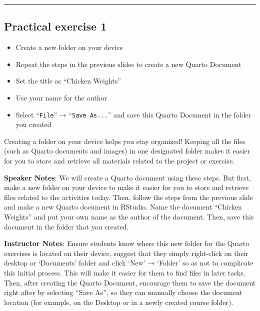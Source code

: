 \documentclass[
  letterpaper,
  DIV=11,
  numbers=noendperiod]{scrartcl}
\providecommand{\tightlist}{%
  \setlength{\itemsep}{0pt}\setlength{\parskip}{0pt}}
\begin{document}
\begin{center}\rule{0.5\linewidth}{0.5pt}\end{center}

\subsection{Practical exercise 1}\label{practical-exercise-1}

\begin{itemize}
\tightlist
\item[$\square$]
  Create a new folder on your device
\item[$\square$]
  Repeat the steps in the previous slides to create a new Quarto
  Document
\item[$\square$]
  Set the title as ``Chicken Weights''
\item[$\square$]
  Use your name for the author
\item[$\square$]
  Select ``\texttt{File}'' → ``\texttt{Save\ As...}'' and save this
  Quarto Document in the folder you created
\end{itemize}

\begin{tcolorbox}[enhanced jigsaw, opacitybacktitle=0.6, toptitle=1mm, colbacktitle=quarto-callout-tip-color!10!white, toprule=.15mm, left=2mm, colback=white, colframe=quarto-callout-tip-color-frame, opacityback=0, bottomtitle=1mm, breakable, titlerule=0mm, rightrule=.15mm, arc=.35mm, title=\textcolor{quarto-callout-tip-color}{\faLightbulb}\hspace{0.5em}{Why make a new folder?}, bottomrule=.15mm, coltitle=black, leftrule=.75mm]

Creating a folder on your device helps you stay organized! Keeping all
the files (such as Quarto documents and images) in one designated folder
makes it easier for you to store and retrieve all materials related to
the project or exercise.

\end{tcolorbox}

\textbf{Speaker Notes}: We will create a Quarto document using these
steps. But first, make a new folder on your device to make it easier for
you to store and retrieve files related to the activities today. Then,
follow the steps from the previous slide and make a new Quarto document
in RStudio. Name the document ``Chicken Weights'' and put your own name
as the author of the document. Then, save this document in the folder
that you created.

\textbf{Instructor Notes}: Ensure students know where this new folder
for the Quarto exercises is located on their device, suggest that they
simply right-click on their desktop or `Documents' folder and click
`New' → `Folder' so as not to complicate this initial process. This will
make it easier for them to find files in later tasks. Then, after
creating the Quarto Document, encourage them to save the document right
after by selecting ``Save As'', so they can manually choose the document
location (for example, on the Desktop or in a newly created course
folder).
\end{document}
